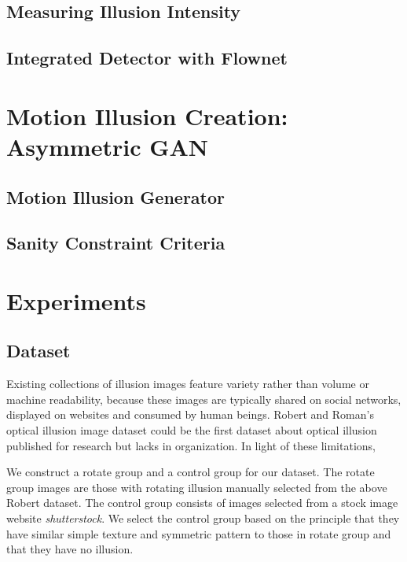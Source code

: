\documentclass[journal]{IEEEtran}
\begin{document}
\subsection{Measuring Illusion Intensity}
\label{sec:detection_measure}

\subsection{Integrated Detector with Flownet}
\label{sec:detection_idf}

\section{Motion Illusion Creation: Asymmetric GAN}
\label{sec:generation}

\subsection{Motion Illusion Generator}
\label{sec:generation_generator}

\subsection{Sanity Constraint Criteria}
\label{sec:generation_criteria}

\section{Experiments}
\label{sec:experiments}

\subsection{Dataset}

Existing collections of illusion images feature variety rather than volume or machine readability, because these images are typically shared on social networks, displayed on websites and consumed by human beings. Robert and Roman's optical illusion image dataset \cite{williams2018optical} could be the first dataset about optical illusion published for research but lacks in organization. In light of these limitations,


We construct a rotate group and a control group for our dataset. The rotate group images are those with rotating illusion manually selected from the above Robert dataset. The control group consists of images selected from a stock image website \emph{shutterstock}. We select the control group based on the principle that they have similar simple texture and symmetric pattern to those in rotate group and that they have no illusion.
\end{document}
